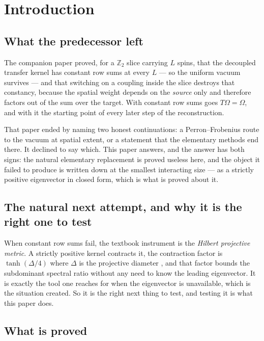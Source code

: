 \documentclass[11pt]{article}
\theoremstyle{definition}
\newcommand{\Z}{\mathbb{Z}}
\newcommand{\Om}{\Omega}
\begin{document}
\section{Introduction}

\subsection{What the predecessor left}

The companion paper \cite{ErikssonSpatial} proved, for a $\Z_2$ slice carrying
$L$ spins, that the decoupled transfer kernel has constant row sums at every
$L$ --- so the uniform vacuum survives --- and that switching on a coupling
inside the slice destroys that constancy, because the spatial weight depends on
the \emph{source} only and therefore factors out of the sum over the target.
With constant row sums goes $T\Om=\Om$, and with it the starting point of every
later step of the reconstruction.

That paper ended by naming two honest continuations: a Perron--Frobenius route
to the vacuum at spatial extent, or a statement that the elementary methods end
there.  It declined to say which.  This paper answers, and the answer has both
signs: the natural elementary replacement is proved useless here, and the
object it failed to produce is written down at the smallest interacting size ---
as a strictly positive eigenvector in closed form, which is what is proved about
it.

\subsection{The natural next attempt, and why it is the right one to test}

When constant row sums fail, the textbook instrument is the \emph{Hilbert
projective metric}.  A strictly positive kernel contracts it, the contraction
factor is $\tanh(\Delta/4)$ where $\Delta$ is the projective diameter
\cite{Birkhoff,Bushell}, and that factor bounds the subdominant spectral ratio
without any need to know the leading eigenvector.  It is exactly the tool one
reaches for when the eigenvector is unavailable, which is the situation
\cite{ErikssonSpatial} created.  So it is the right next thing to test, and
testing it is what this paper does.

\subsection{What is proved}
\end{document}
